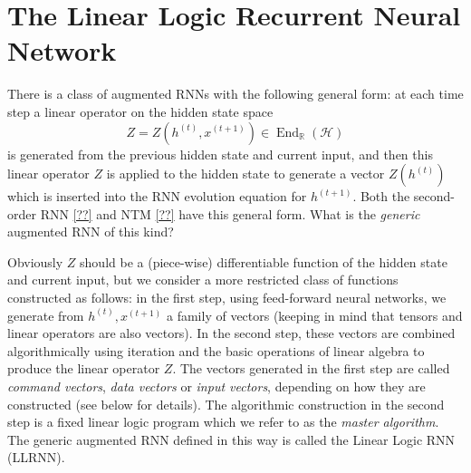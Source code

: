 \documentclass[english,letter paper,12pt,leqno]{article}
\theoremstyle{example}
\numberwithin{equation}{section}
\DeclareMathOperator{\End}{End}
\begin{document}
\section{The Linear Logic Recurrent Neural Network}

There is a class of augmented RNNs with the following general form: at each time step a linear operator on the hidden state space
\[
Z = Z(h^{(t)}, x^{(t+1)}) \in \End_{\mathbb{R}}(\mathscr{H})
\]
is generated from the previous hidden state and current input, and then this linear operator $Z$ is applied to the hidden state to generate a vector $Z(h^{(t)})$ which is inserted into the RNN evolution equation for $h^{(t+1)}$. Both the second-order RNN \eqref{??} and NTM \eqref{??} have this general form. What is the \emph{generic} augmented RNN of this kind? 

Obviously $Z$ should be a (piece-wise) differentiable function of the hidden state and current input, but we consider a more restricted class of functions constructed as follows: in the first step, using feed-forward neural networks, we generate from $h^{(t)}, x^{(t+1)}$ a family of vectors (keeping in mind that tensors and linear operators are also vectors). In the second step, these vectors are combined algorithmically using iteration and the basic operations of linear algebra to produce the linear operator $Z$. The vectors generated in the first step are called \emph{command vectors}, \emph{data vectors} or \emph{input vectors}, depending on how they are constructed (see below for details). The algorithmic construction in the second step is a fixed linear logic program which we refer to as the \emph{master algorithm}. The generic augmented RNN defined in this way is called the Linear Logic RNN (LLRNN).
\end{document}
